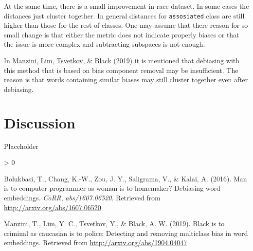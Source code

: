 \documentclass[
  12pt,
]{book}
\newlength{\cslhangindent}
\newenvironment{CSLReferences}[2] %
 {%
  \setlength{\parindent}{0pt}
  \ifodd #1 \everypar{\setlength{\hangindent}{\cslhangindent}}\ignorespaces\fi
  \ifnum #2 > 0
  \setlength{\parskip}{#2\baselineskip}
  \fi
 }%
 {}
\begin{document}
At the same time, there is a small improvement in race dataset. In some cases the distances just cluster together. In general distances for \texttt{assosiated} class are still higher than those for the rest of classes. One may assume that there reason for so small change is that either the metric does not indicate properly biases or that the issue is more complex and subtracting subspaces is not enough.

In \protect\hyperlink{ref-Manzini2019blackToCriminal}{Manzini, Lim, Tsvetkov, \& Black} (\protect\hyperlink{ref-Manzini2019blackToCriminal}{2019}) it is mentioned that debiasing with this method that is based on bias component removal may be insufficient. The reason is that words containing similar biases may still cluster together even after debiasing.

\hypertarget{discussion}{%
\chapter{Discussion}\label{discussion}}

Placeholder

\hypertarget{refs}{}
\begin{CSLReferences}{1}{0}
\leavevmode\hypertarget{ref-Bolukbasi2016Man}{}%
Bolukbasi, T., Chang, K.-W., Zou, J. Y., Saligrama, V., \& Kalai, A. (2016). Man is to computer programmer as woman is to homemaker? Debiasing word embeddings. \emph{CoRR}, \emph{abs/1607.06520}. Retrieved from \url{http://arxiv.org/abs/1607.06520}

\leavevmode\hypertarget{ref-Manzini2019blackToCriminal}{}%
Manzini, T., Lim, Y. C., Tsvetkov, Y., \& Black, A. W. (2019). Black is to criminal as caucasian is to police: Detecting and removing multiclass bias in word embeddings. Retrieved from \url{http://arxiv.org/abs/1904.04047}

\end{CSLReferences}
\end{document}

